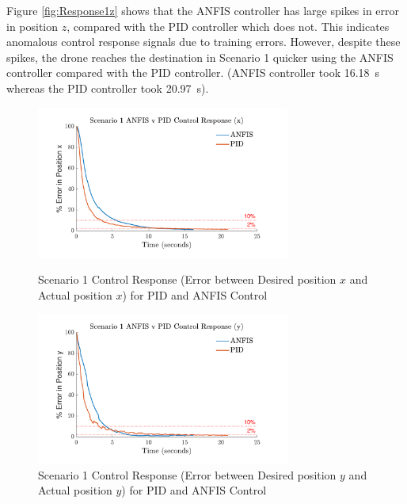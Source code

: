Figure \ref{fig:Response1z} shows that the ANFIS controller has large spikes in error in position $z$, compared with the PID controller which does not. This indicates anomalous control response signals due to training errors. However, despite these spikes, the drone reaches the destination in Scenario 1 quicker using the ANFIS controller compared with the PID controller. (ANFIS controller took \SI{16.18}{\second} whereas the PID controller took \SI{20.97}{\second}).
\begin{figure}[H]
    \centering
    \begin{minipage}[b]{0.45\textwidth}
        \centering
        \includegraphics[height=5cm,keepaspectratio]{img/Scenario 1 Error in x Position.pdf}
        \caption{Scenario 1 Control Response (Error between Desired position $x$ and Actual position $x$) for PID and ANFIS Control}
        \label{fig:Response1x}
    \end{minipage}
    \hfill
    \begin{minipage}[b]{0.45\textwidth}
        \centering
        \includegraphics[height=5cm,keepaspectratio]{img/Scenario 1 Error in y Position.pdf}
        \caption{Scenario 1 Control Response (Error between Desired position $y$ and Actual position $y$) for PID and ANFIS Control}
        \label{fig:Response1y}
    \end{minipage}
\end{figure}
